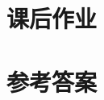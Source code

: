 \newpage
\section{课后作业}
  \begin{exercise}
  \end{exercise}
\stopexercise

\newpage
\section{参考答案}
\begin{multicols}{2}
  \printanswer
\end{multicols}
